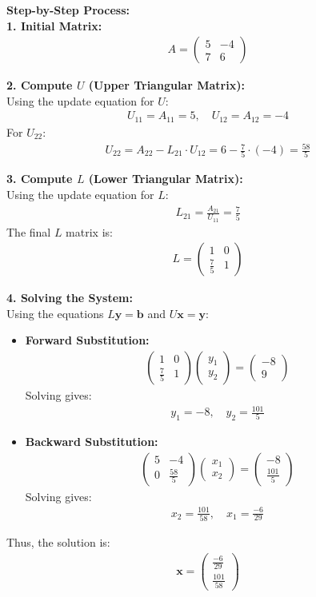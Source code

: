 \documentclass{beamer}
\theoremstyle{remark}
\newcommand{\myvec}[1]{\ensuremath{\begin{pmatrix}#1\end{pmatrix}}}
\let\vec\mathbf
\numberwithin{equation}{section}
\begin{document}
\begin{frame}
\textbf{Step-by-Step Process:}\\

\textbf{1. Initial Matrix:}
\begin{align}
    A = \myvec{5 & -4 \\ 7 & 6}
\end{align}

\textbf{2. Compute $U$ (Upper Triangular Matrix):}\\
Using the update equation for $U$:
\begin{align}
    U_{11} = A_{11} = 5, \quad U_{12} = A_{12} = -4
\end{align}
For $U_{22}$:
\begin{align}
    U_{22} = A_{22} - L_{21} \cdot U_{12} = 6 - \frac{7}{5} \cdot (-4) = \frac{58}{5}
\end{align}

\textbf{3. Compute $L$ (Lower Triangular Matrix):}\\
Using the update equation for $L$:
\begin{align}
    L_{21} = \frac{A_{21}}{U_{11}} = \frac{7}{5}
\end{align}
The final $L$ matrix is:
\begin{align}
    L = \myvec{1 & 0 \\ \frac{7}{5} & 1}
\end{align}
\end{frame}
\begin{frame}
\textbf{4. Solving the System:}\\
Using the equations $L\vec{y} = \vec{b}$ and $U\vec{x} = \vec{y}$:
\begin{itemize}
    \item \textbf{Forward Substitution:}
    \begin{align}
        \myvec{1 & 0 \\ \frac{7}{5} & 1}\myvec{y_1 \\ y_2} = \myvec{-8 \\ 9}
    \end{align}
    Solving gives:
    \begin{align}
        y_1 = -8, \quad y_2 = \frac{101}{5}
    \end{align}

    \item \textbf{Backward Substitution:}
    \begin{align}
        \myvec{5 & -4 \\ 0 & \frac{58}{5}}\myvec{x_1 \\ x_2} = \myvec{-8 \\ \frac{101}{5}}
    \end{align}
    Solving gives:
    \begin{align}
        x_2 = \frac{101}{58}, \quad x_1 = \frac{-6}{29}
    \end{align}
\end{itemize}

Thus, the solution is:
\begin{align}
    \vec{x} = \myvec{\frac{-6}{29} \\ \frac{101}{58}}
\end{align}
\end{frame}
\end{document}
